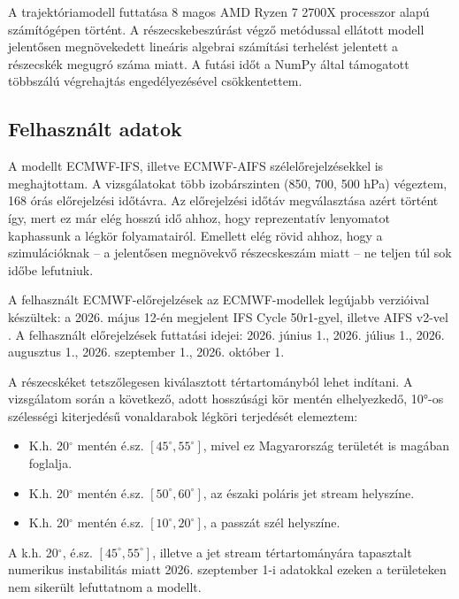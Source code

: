 \documentclass[12pt,a4paper]{article}
\begin{document}
A trajektóriamodell futtatása 8 magos AMD Ryzen 7 2700X processzor alapú számítógépen történt. A részecskebeszúrást végző metódussal ellátott modell jelentősen megnövekedett lineáris algebrai számítási terhelést jelentett a részecskék megugró száma miatt. A futási időt a NumPy által támogatott többszálú végrehajtás engedélyezésével csökkentettem.

\subsection{Felhasznált adatok}

A modellt ECMWF-IFS, illetve ECMWF-AIFS szélelőrejelzésekkel is meghajtottam. A vizsgálatokat több izobárszinten (850, 700, 500 hPa) végeztem, 168 órás előrejelzési időtávra. Az előrejelzési időtáv megválasztása azért történt így, mert ez már elég hosszú idő ahhoz, hogy reprezentatív lenyomatot kaphassunk a légkör folyamatairól. Emellett elég rövid ahhoz, hogy a szimulációknak -- a jelentősen megnövekvő részecskeszám miatt -- ne teljen túl sok időbe lefutniuk. 

A felhasznált ECMWF-előrejelzések az ECMWF-modellek legújabb verzióival készültek: a 2026. május 12-én megjelent IFS Cycle 50r1-gyel, illetve AIFS v2-vel \cite{snell_significant_2026}. A felhasznált előrejelzések futtatási idejei: 2026. június 1., 2026. július 1., 2026. augusztus 1., 2026. szeptember 1., 2026. október 1.

A részecskéket tetszőlegesen kiválasztott tértartományból lehet indítani. A vizsgálatom során a következő, adott hosszúsági kör mentén elhelyezkedő, 10°-os szélességi kiterjedésű vonaldarabok légköri terjedését elemeztem:
\begin{itemize}
    \item K.h. 20$^\circ$ mentén é.sz. $[45^\circ, 55^\circ]$, mivel ez Magyarország területét is magában foglalja.
    \item K.h. 20$^\circ$ mentén é.sz. $[50^\circ, 60^\circ]$, az északi poláris jet stream helyszíne.
    \item K.h. 20$^\circ$ mentén é.sz. $[10^\circ, 20^\circ]$, a passzát szél helyszíne.
\end{itemize}


A k.h. 20$^\circ$, é.sz. $[45^\circ, 55^\circ]$, illetve a jet stream tértartományára tapasztalt numerikus instabilitás miatt 2026. szeptember 1-i adatokkal ezeken a területeken nem sikerült lefuttatnom a modellt.
\end{document}
